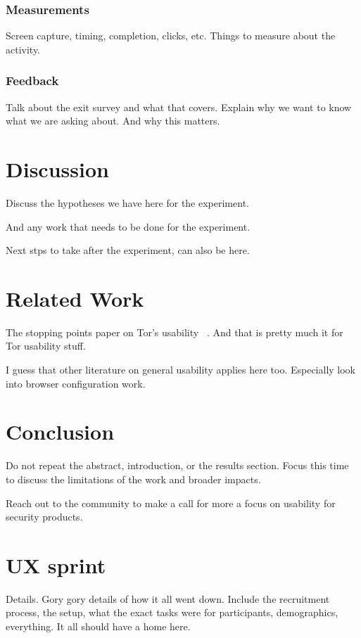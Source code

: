 \documentclass[letterpaper,twocolumn,10pt]{article}
\begin{document}
\subsubsection{Measurements}
Screen capture, timing, completion, clicks, etc. Things to measure
about the activity. 


\subsubsection{Feedback} 
Talk about the exit survey and what that covers. 
Explain why we want to know what we are asking about. 
And why this matters. 

\section{Discussion} 
Discuss the hypotheses we have here for the experiment. 

And any work that needs to be done for the experiment. 

Next stps to take after the experiment, can also be here. %

\section{Related Work} %
The stopping points paper on Tor's usability ~\cite{norcie2012eliminating}. 
And that is pretty much it for Tor usability stuff. %

I guess that other literature on general usability applies here too. %
Especially look into browser configuration work. %

\section{Conclusion} 
Do not repeat the abstract, introduction, or the results section. 
Focus this time to discuss the limitations of the work and broader impacts. 

Reach out to the community to make a call for more a focus on usability for security products. 

\appendix

\section{UX sprint} 
Details. Gory gory details of how it all went down. 
Include the recruitment process, the setup, what the exact 
tasks were for participants, demographics, everything. 
It all should have a home here. 
\end{document}

